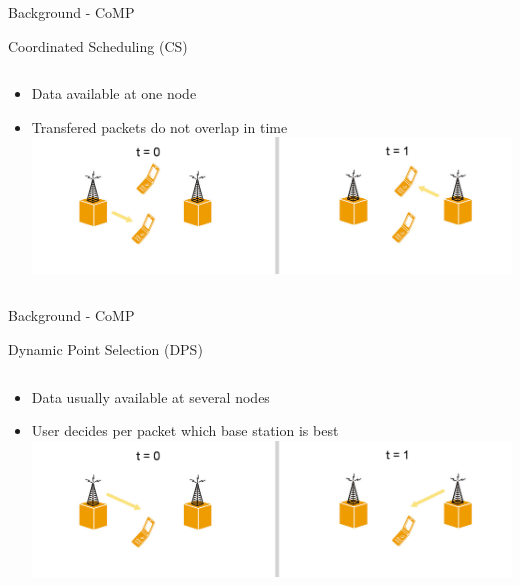 \documentclass[xcolor={cmyk}]{beamer}
\begin{document}
 \begin{frame}{Background - CoMP}
 	\begin{block}{Coordinated Scheduling (CS)}
		\begin{columns}
			\begin{column}{.9\textwidth}
				\begin{itemize}
					\item Data available at one node
					\item Transfered packets do not overlap in time
					\includegraphics[width=\linewidth,height=\textheight,keepaspectratio]{GrafikCS.png}
				\end{itemize}
			\end{column}
		\end{columns}
	 \end{block}
 \end{frame}

 \begin{frame}{Background - CoMP}
 	\begin{block}{Dynamic Point Selection (DPS)}
		\begin{columns}
			\begin{column}{.9\textwidth}
				\begin{itemize}
					\item Data usually available at several nodes
					\item User decides per packet which base station is best
					\includegraphics[width=\linewidth,height=\textheight,keepaspectratio]{GrafikDPS.png}
				\end{itemize}
			\end{column}
		\end{columns}
	 \end{block}
 \end{frame}
 
\end{document}
